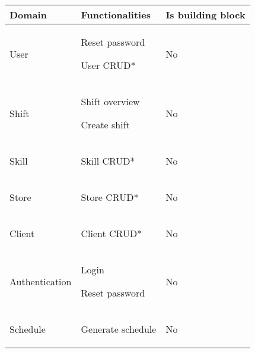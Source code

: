 \begin{tabularx}{\linewidth}{|>{}X|>{}X|>{}X|}
    \hline

    Domain
     &
    Functionalities
    &
    Is building block
    \\ \hline

    User
     &
    \begin{compactitem}
        \item Reset password
        \item User CRUD*
    \end{compactitem}
    &
    No
    \\ \hline

    Shift
     &
    \begin{compactitem}
        \item Shift overview
        \item Create shift
    \end{compactitem}
    &
    No
    \\ \hline

    Skill
     &
    \begin{compactitem}
        \item Skill CRUD*
    \end{compactitem}
    &
    No
    \\ \hline

    Store
     &
    \begin{compactitem}
        \item Store CRUD*
    \end{compactitem}
    &
    No
    \\ \hline

    Client
     &
    \begin{compactitem}
        \item Client CRUD*
    \end{compactitem}
    &
    No
    \\ \hline

    Authentication
     &
    \begin{compactitem}
        \item Login
        \item Reset password
    \end{compactitem}
    &
    No
    \\ \hline

    Schedule
     &
    \begin{compactitem}
        \item Generate schedule
    \end{compactitem}
    &
    No
    \\ \hline


\end{tabularx}
